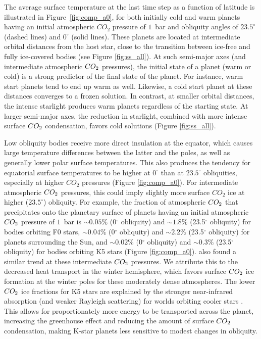 \documentclass[fleqn,usenatbib]{mnras}
\begin{document}
The  average surface temperature at the last time step as a function of latitude is illustrated in Figure~\ref{fig:comp_a0}, for both initially cold and warm planets having an initial atmospheric $CO_{\mathrm{2}}$ pressure of $1$~bar and obliquity angles of $23.5^{\circ}$ (dashed lines) and $0^{\circ}$ (solid lines). These planets are located at intermediate orbital distances from the host star, close to the transition between ice-free and fully ice-covered bodies (see Figure \ref{fig:ss_all}). At such semi-major axes (and intermediate atmospheric $CO_{\rm 2}$ pressures), the initial state of a planet (warm or cold) is a strong predictor of  the final state of the planet. For instance, warm start planets tend to end up warm as well. Likewise, a cold start planet at these distances converges to a frozen solution. In contrast, at smaller  orbital distances, the intense starlight produces warm planets regardless of the starting state. At larger semi-major axes, the reduction in starlight, combined with more intense surface $CO_{\rm 2}$ condensation, favors cold solutions (Figure \ref{fig:ss_all}). 

Low obliquity bodies receive more direct insulation at the equator, which causes large temperature differences between the latter and the poles, as well as generally lower polar surface temperatures. This also produces the tendency for equatorial surface temperatures to be higher at $0^{\circ}$ than at $23.5^{\circ}$ obliquities, especially at higher $CO_{\mathrm{2}}$ pressures (Figure \ref{fig:comp_a0}). For intermediate atmospheric $CO_{\rm 2}$ pressures, this could imply slightly more surface $CO_{\mathrm{2}}$ ice at higher ($23.5^{\circ}$) obliquity. For example, the fraction of atmospheric $CO_{\rm 2}$ that precipitates onto the planetary surface of planets having an initial atmospheric $CO_{\rm 2}$ pressure of $1$~bar is $\sim 0.05 \%$ (0$^{\circ}$ obliquity) and $\sim 1.8\%$ (23.5$^{\circ}$ obliquity) for bodies orbiting F0 stars, $\sim 0.04 \%$ (0$^{\circ}$ obliquity) and $\sim 2.2\%$ (23.5$^{\circ}$ obliquity) for planets surrounding the Sun, and $\sim 0.02 \%$ (0$^{\circ}$ obliquity) and $\sim 0.3\%$ (23.5$^{\circ}$ obliquity) for bodies orbiting K5 stars (Figure \ref{fig:comp_a0}). \citet{Soto2015} also found a similar trend at these intermediate $CO_{\rm 2}$ pressures. We attribute this to the decreased heat transport in the winter hemisphere, which favors surface $CO_{\rm 2}$ ice formation at the winter poles for these moderately dense atmospheres. The lower $CO_{\rm 2}$ ice fractions for K5 stars are explained by the stronger near-infrared absorption  (and weaker Rayleigh scattering) for worlds orbiting cooler stars \citep{kasting1993}. This allows for proportionately more energy to be transported across the planet, increasing the greenhouse effect and reducing the amount of surface $CO_{\rm 2}$ condensation, making K-star planets less sensitive to modest changes in obliquity.
\end{document}
